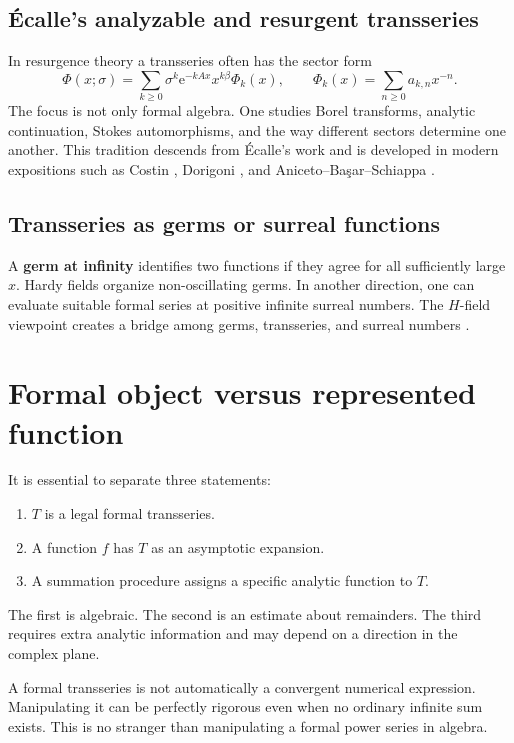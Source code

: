 \documentclass[11pt,openany]{book}
\theoremstyle{plain}
\theoremstyle{definition}
\theoremstyle{remark}
\newcommand{\e}{\mathrm{e}}
\newcommand{\defterm}[1]{\textbf{#1}}
\begin{document}
\subsection{\'{E}calle's analyzable and resurgent transseries}
In resurgence theory a transseries often has the sector form
\[
  \Phi(x;\sigma)=\sum_{k\ge0}\sigma^k\e^{-kAx}x^{k\beta}\Phi_k(x),
  \qquad
  \Phi_k(x)=\sum_{n\ge0}a_{k,n}x^{-n}.
\]
The focus is not only formal algebra. One studies Borel transforms, analytic continuation, Stokes automorphisms, and the way different sectors determine one another. This tradition descends from \'{E}calle's work \cite{Ecalle1992} and is developed in modern expositions such as Costin \cite{Costin2009}, Dorigoni \cite{Dorigoni2019}, and Aniceto--Ba\c{s}ar--Schiappa \cite{ABS2019}.

\subsection{Transseries as germs or surreal functions}
A \defterm{germ at infinity} identifies two functions if they agree for all sufficiently large $x$. Hardy fields organize non-oscillating germs. In another direction, one can evaluate suitable formal series at positive infinite surreal numbers. The $H$-field viewpoint creates a bridge among germs, transseries, and surreal numbers \cite{ADH2017,ADH2018,BM2018,BM2019}.

\section{Formal object versus represented function}
It is essential to separate three statements:
\begin{enumerate}
\item $T$ is a legal formal transseries.
\item A function $f$ has $T$ as an asymptotic expansion.
\item A summation procedure assigns a specific analytic function to $T$.
\end{enumerate}
The first is algebraic. The second is an estimate about remainders. The third requires extra analytic information and may depend on a direction in the complex plane.

\begin{warningbox}
A formal transseries is not automatically a convergent numerical expression. Manipulating it can be perfectly rigorous even when no ordinary infinite sum exists. This is no stranger than manipulating a formal power series in algebra.
\end{warningbox}
\end{document}
